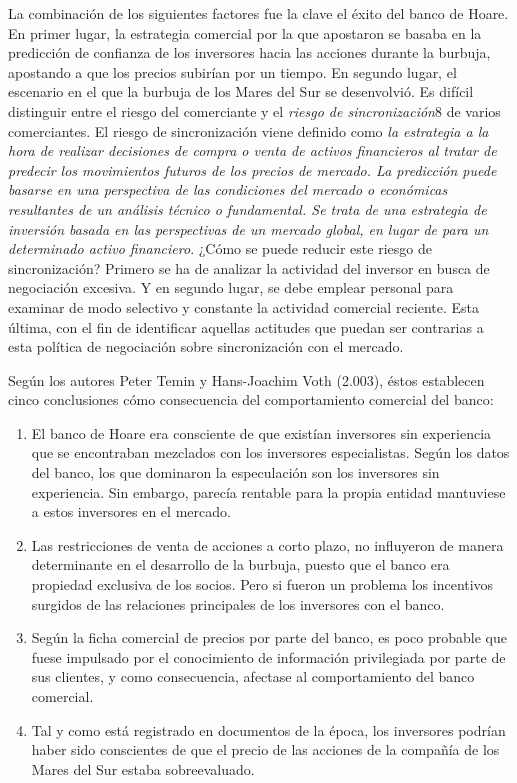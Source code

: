 La combinación de los siguientes factores fue la clave el éxito del banco de Hoare. En primer lugar, la estrategia comercial por la que apostaron se basaba en la predicción de confianza de los inversores hacia las acciones durante la burbuja, apostando a que los precios subirían por un tiempo. En segundo lugar, el escenario en el que la burbuja de los Mares del Sur se desenvolvió. Es difícil distinguir entre el riesgo del comerciante y el \emph{riesgo de sincronización}8 de varios comerciantes. El riesgo de sincronización viene definido como \emph{la estrategia a la hora de realizar decisiones de compra o venta de activos financieros al tratar de predecir los movimientos futuros de los precios de mercado. La predicción puede basarse en una perspectiva de las condiciones del mercado o económicas resultantes de un análisis técnico o fundamental. Se trata de una estrategia de inversión basada en las perspectivas de un mercado global, en lugar de para un determinado activo financiero}. ¿Cómo se puede reducir este riesgo de sincronización? Primero se ha de analizar la actividad del inversor en busca de negociación excesiva. Y en segundo lugar, se debe emplear personal para examinar de modo selectivo y constante la actividad comercial reciente. Esta última, con el fin de identificar aquellas actitudes que puedan ser contrarias a esta política de negociación sobre sincronización con el mercado.

Según los autores Peter Temin y Hans-Joachim Voth (2.003), éstos establecen cinco conclusiones cómo consecuencia del comportamiento comercial del banco:

\begin{enumerate}
	\item El banco de Hoare era consciente de que existían inversores sin experiencia que se encontraban mezclados con los inversores especialistas. Según los datos del banco, los que dominaron la especulación son los inversores sin experiencia. Sin embargo, parecía rentable para la propia entidad mantuviese a estos inversores en el mercado.
	\item Las restricciones de venta de acciones a corto plazo, no influyeron de manera determinante en el desarrollo de la burbuja, puesto que el banco era propiedad exclusiva de los socios. Pero si fueron un problema los incentivos surgidos de las relaciones principales de los inversores con el banco. 
	\item Según la ficha comercial de precios por parte del banco, es poco probable que fuese impulsado por el conocimiento de información privilegiada por parte de sus clientes, y como consecuencia, afectase al comportamiento del banco comercial. 
	\item Tal y como está registrado en documentos de la época, los inversores podrían haber sido conscientes de que el precio de las acciones de la compañía de los Mares del Sur estaba sobreevaluado. 
\end{enumerate}

